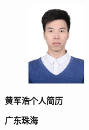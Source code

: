 \documentclass[UTF8,AutoFakeBold]{resume}
\begin{document}
    \begin{figure}[h]
        \flushright
        \includegraphics[height=3.5cm,width=2.5cm]{fonts/hjh.jpg}
    \end{figure}
\vspace{-0.175\linewidth}
    \begin{minipage}[t]{0.275\textwidth}
        \centering
        \LARGE\fangsong\textbf{{黄军浩{\small{\textbullet}}个人简历}}
    \end{minipage}
\vspace{3mm}
\par
\faMapMarker \hspace{0.25em}\fangsong\textbf{广东\textbullet 珠海}
\end{document}
